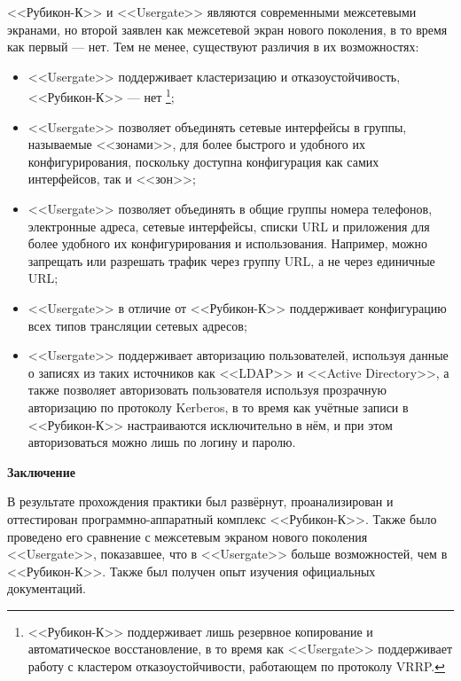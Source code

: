<<Рубикон-К>> и <<Usergate>> являются современными межсетевыми экранами, но второй заявлен как межсетевой экран нового поколения, в то время как первый --- нет. Тем не менее, существуют различия в их возможностях:
\begin{itemize}
	\item <<Usergate>> поддерживает кластеризацию и отказоустойчивость, <<Рубикон-К>> --- нет \footnote{<<Рубикон-К>> поддерживает лишь резервное копирование и автоматическое восстановление, в то время как <<Usergate>> поддерживает работу с кластером отказоустойчивости, работающем по протоколу VRRP.};
	
	\item <<Usergate>> позволяет объединять сетевые интерфейсы в группы, называемые <<зонами>>, для более быстрого и удобного их конфигурирования, поскольку доступна конфигурация как самих интерфейсов, так и <<зон>>;
	
	\item  <<Usergate>> позволяет объединять в общие группы номера телефонов, электронные адреса, сетевые интерфейсы, списки URL и приложения для более удобного их конфигурирования и использования. Например, можно запрещать или разрешать трафик через группу URL, а не через единичные URL;
	
	\item <<Usergate>> в отличие от <<Рубикон-К>> поддерживает конфигурацию всех типов трансляции сетевых адресов;

	\item <<Usergate>> поддерживает авторизацию пользователей, используя данные о записях из таких источников как <<LDAP>> и <<Active Directory>>, а также позволяет авторизовать пользователя используя прозрачную авторизацию по протоколу Kerberos, в то время как учётные записи в <<Рубикон-К>> настраиваются исключительно в нём, и при этом авторизоваться можно лишь по логину и паролю.
\end{itemize}

\newpage

\begin{center}
	\textbf{\Large Заключение}
\end{center}

В результате прохождения практики был развёрнут, проанализирован и оттестирован программно-аппаратный комплекс <<Рубикон-К>>. Также было проведено его сравнение с межсетевым экраном нового поколения <<Usergate>>, показавшее, что в <<Usergate>> больше возможностей, чем в <<Рубикон-К>>. Также был получен опыт изучения официальных документаций.

